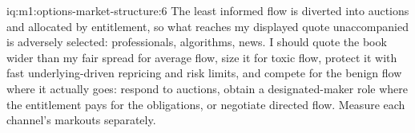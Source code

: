 \begin{solution}{iq:m1:options-market-structure:6}
The least informed flow is diverted into auctions and allocated by
entitlement, so what reaches my displayed quote unaccompanied is adversely
selected: professionals, algorithms, news. I should quote the book wider
than my fair spread for average flow, size it for toxic flow, protect it
with fast underlying-driven repricing and risk limits, and compete for the
benign flow where it actually goes: respond to auctions, obtain a
designated-maker role where the entitlement pays for the obligations, or
negotiate directed flow. Measure each channel's markouts separately.
\end{solution}
